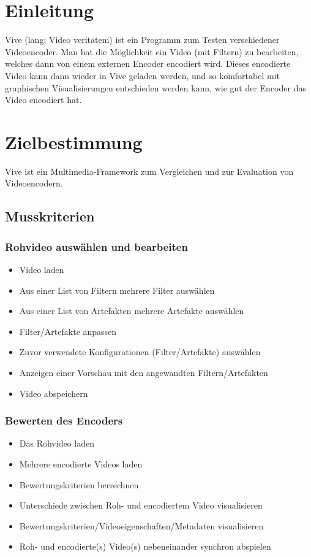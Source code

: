 \documentclass[parskip=full]{scrartcl}
\author {Carina Weber, Jan Benedikt Schwarz, Johannes Werner, Noel Schuhmacher,\\
Sascha Rapp, Simon Grafenhorst}
\begin{document}
\maketitle
\thispagestyle{empty}
\newpage
\tableofcontents
\newpage
\section*{Einleitung}
Vive (lang: Video veritatem) ist ein Programm zum Testen verschiedener Videoencoder. Man hat die Möglichkeit ein Video (mit Filtern) zu bearbeiten, welches dann von einem externen Encoder encodiert wird. Dieses encodierte Video kann dann wieder in Vive geladen werden, und so komfortabel mit graphischen Visualisierungen entschieden werden kann, wie gut der Encoder das Video encodiert hat.
\newpage
\section{Zielbestimmung}
Vive ist ein Multimedia-Framework zum Vergleichen und zur Evaluation von Videoencodern.
\subsection{Musskriterien}
\subsubsection{Rohvideo auswählen und bearbeiten}
\begin{itemize}
\item Video laden
\item Aus einer List von Filtern mehrere Filter auswählen
\item Aus einer List von Artefakten mehrere Artefakte auswählen
\item Filter/Artefakte anpassen
\item Zuvor verwendete Konfigurationen (Filter/Artefakte) auswählen
\item Anzeigen einer Vorschau mit den angewandten Filtern/Artefakten
\item Video abspeichern
\end{itemize}
\subsubsection{Bewerten des Encoders}
\begin{itemize}
\item Das Rohvideo laden
\item Mehrere encodierte Videos laden
\item Bewertungskriterien berrechnen
\item Unterschiede zwischen Roh- und encodiertem Video visualisieren
\item Bewertungskriterien/Videoeigenschaften/Metadaten visualisieren
\item Roh- und encodierte(s) Video(s) nebeneinander synchron abspielen
\end{itemize}
\newpage
\end{document}
